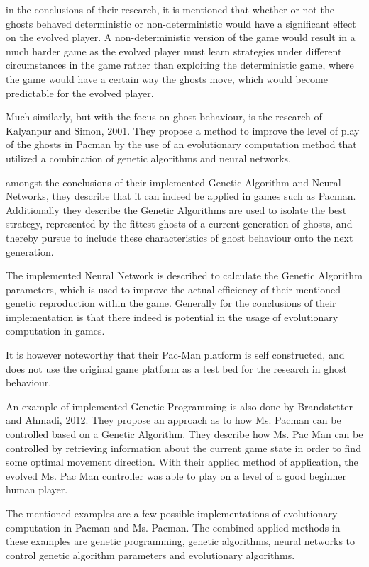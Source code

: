 in the conclusions of their research, it is mentioned that whether or not the ghosts behaved deterministic or non-deterministic would have a significant effect on the evolved player. A non-deterministic version of the game would result in a much harder game  as the evolved player must learn strategies under different circumstances in the game rather than exploiting the deterministic game, where the game would have a certain way the ghosts move, which would become predictable for the evolved player.\cite[pp. 8]{Lucas2005}

Much similarly, but with the focus on ghost behaviour, is the research of Kalyanpur and Simon, 2001. They propose a method to improve the level of play of the ghosts in Pacman by the use of an evolutionary computation method that utilized a combination of genetic algorithms and neural networks. \cite{Kalyanpur2001}

amongst the conclusions of their implemented Genetic Algorithm and Neural Networks, they describe that it can indeed be applied in games such as Pacman. Additionally they describe the Genetic Algorithms are used to isolate the best strategy, represented by the fittest ghosts of a current generation of ghosts, and thereby pursue to include these characteristics of ghost behaviour onto the next generation. \cite[pp. 8]{Kalyanpur2001}

The implemented Neural Network is described to calculate the Genetic Algorithm parameters, which is used to improve the actual efficiency of their mentioned genetic reproduction within the game. Generally for the conclusions of their implementation is that there indeed is potential in the usage of evolutionary computation in games.

It is however noteworthy that their Pac-Man platform is self constructed, and does not use the original game platform as a test bed for the research in ghost behaviour.

An example of implemented Genetic Programming is also done by Brandstetter and Ahmadi, 2012. They propose an approach as to how Ms. Pacman can be controlled based on a Genetic Algorithm.
They describe how Ms. Pac Man can be controlled by retrieving information about the current game state in order to find some optimal movement direction.
With their applied method of application, the evolved Ms. Pac Man controller was able to play on a level of a good beginner human player. \cite{Brandstetter2012}

The mentioned examples are a few possible implementations of evolutionary computation in Pacman and Ms. Pacman. The combined applied methods in these examples are genetic programming, genetic algorithms, neural networks to control genetic algorithm parameters and evolutionary algorithms.\\

